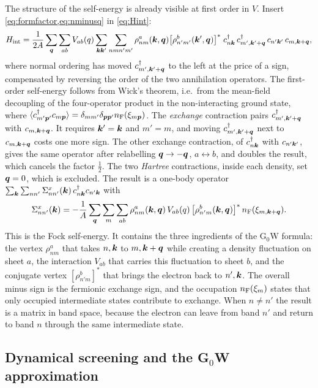 The structure of the self-energy is already visible at first order in $V$. Insert \cref{eq:formfactor,eq:nminusq}
in \cref{eq:Hint}:
\begin{equation}
H_{\rm int}=\frac1{2A}\sum_{\bm q}\sum_{ab}V_{ab}(q)\sum_{\bm k\bm k'}\sum_{nm n'm'}
\rho^a_{nm}(\bm k,\bm q)\bigl[\rho^b_{n'm'}(\bm k',\bm q)\bigr]^*\;
c^\dagger_{n\bm k}\,c^\dagger_{m',\bm k'+\bm q}\,c_{n'\bm k'}\,c_{m,\bm k+\bm q},
\end{equation}
where normal ordering has moved $c^\dagger_{m',\bm k'+\bm q}$ to the left at the price of a sign, compensated by
reversing the order of the two annihilation operators. The first-order self-energy follows from Wick's
theorem, i.e.\ from the mean-field decoupling of the four-operator product in the non-interacting ground
state, where $\langle c^\dagger_{m'\bm p'}c_{m\bm p}\rangle=\delta_{mm'}\delta_{\bm p\bm p'}n_{\rm F}(\xi_{m\bm p})$. The
\emph{exchange} contraction pairs $c^\dagger_{m',\bm k'+\bm q}$ with $c_{m,\bm k+\bm q}$. It requires $\bm k'=\bm k$ and
$m'=m$, and moving $c^\dagger_{m',\bm k'+\bm q}$ next to $c_{m,\bm k+\bm q}$ costs one more sign. The other exchange
contraction, of $c^\dagger_{n\bm k}$ with $c_{n'\bm k'}$, gives the same operator after relabelling $\bm q\to-\bm q$,
$a\leftrightarrow b$, and doubles the result, which cancels the factor $\frac12$. The two \emph{Hartree} contractions,
inside each density, set $\bm q=0$, which is excluded. The result is a one-body operator
$\sum_{\bm k}\sum_{nn'}\Sigma^x_{nn'}(\bm k)\,c^\dagger_{n\bm k}c_{n'\bm k}$ with
\begin{equation}
\Sigma^x_{nn'}(\bm k)=-\frac1A\sum_{\bm q}\sum_m\sum_{ab}\rho^a_{nm}(\bm k,\bm q)\,V_{ab}(q)\,
\bigl[\rho^b_{n'm}(\bm k,\bm q)\bigr]^*\,n_{\rm F}(\xi_{m,\bm k+\bm q}) .
\label{eq:fock}
\end{equation}
This is the Fock self-energy. It contains the three ingredients of the G$_0$W formula: the vertex
$\rho^a_{nm}$ that takes $n,\bm k$ to $m,\bm k+\bm q$ while creating a density fluctuation on sheet $a$, the
interaction $V_{ab}$ that carries this fluctuation to sheet $b$, and the conjugate vertex
$[\rho^b_{n'm}]^*$ that brings the electron back to $n',\bm k$. The overall minus sign is the fermionic exchange
sign, and the occupation $n_{\rm F}(\xi_m)$ states that only occupied intermediate states contribute to exchange.
When $n\neq n'$ the result is a matrix in band space, because the electron can leave from band $n'$ and
return to band $n$ through the same intermediate state.

\subsection{Dynamical screening and the G$_0$W approximation}
\label{sec:gw}
\label{sec:sigma_derivation}

